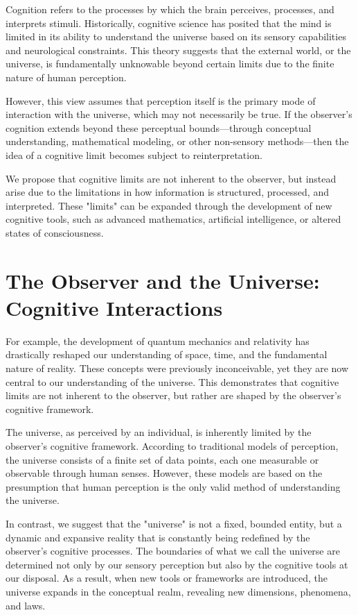 \documentclass[twocolumn]{article}
\begin{document}
    Cognition refers to the processes by which the brain perceives, processes, and interprets stimuli.
    Historically, cognitive science has posited that the mind is limited in its ability to understand
    the universe based on its sensory capabilities and neurological constraints.
    This theory suggests that the external world, or the universe,
    is fundamentally unknowable beyond certain limits due to the finite nature of human perception.

    However, this view assumes that perception itself is the primary mode of interaction with the universe,
    which may not necessarily be true.
    If the observer's cognition extends beyond these perceptual
    bounds—through conceptual understanding, mathematical modeling, or other non-sensory methods—then
    the idea of a cognitive limit becomes subject to reinterpretation.

    We propose that cognitive limits are not inherent to the observer, but instead arise
    due to the limitations in how information is structured, processed, and interpreted.
    These "limits" can be expanded through the development of new cognitive tools, such as advanced mathematics,
    artificial intelligence, or altered states of consciousness.


    \section{The Observer and the Universe: Cognitive Interactions}
    \label{sec:the-observer-and-the-universe:-cognitive-interactions}

    For example, the development of quantum mechanics and relativity has drastically reshaped
    our understanding of space, time, and the fundamental nature of reality.
    These concepts were previously inconceivable, yet they are now central to our understanding of the universe.
    This demonstrates that cognitive limits are not inherent to the observer,
    but rather are shaped by the observer's cognitive framework.

    The universe, as perceived by an individual, is inherently limited by the observer's cognitive framework.
    According to traditional models of perception, the universe consists of a finite set of data points,
    each one measurable or observable through human senses.
    However, these models are based on the presumption that human perception
    is the only valid method of understanding the universe.

    In contrast, we suggest that the "universe" is not a fixed, bounded entity, but a dynamic and expansive reality
    that is constantly being redefined by the observer's cognitive processes.
    The boundaries of what we call the universe are determined not only by our sensory perception
    but also by the cognitive tools at our disposal.
    As a result, when new tools or frameworks are introduced,
    the universe expands in the conceptual realm, revealing new dimensions, phenomena, and laws.
\end{document}
